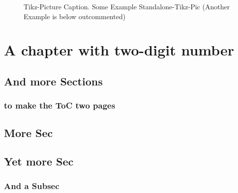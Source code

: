 \np
%
\begin{figure}[!htpb]
    \centering
    \caption{Tikz-Picture Caption. Some Example Standalone-Tikz-Pic (Another Example is below outcommented)}
    \label{fig:tikz_test}
\end{figure}
%
%
%
%



\setcounter{chapter}{9}
\chapter{A chapter with two-digit number}
\section{And more Sections}
\subsection{to make the ToC two pages}
\section{More Sec}
\section{Yet more Sec}
\subsection{And a Subsec}


